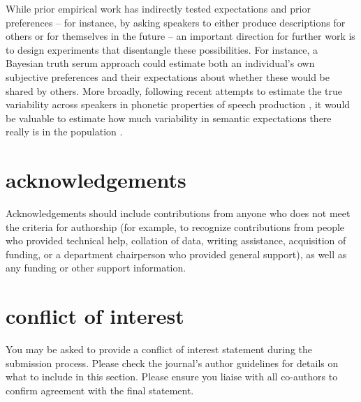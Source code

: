 \documentclass[alpha-refs]{wiley-article}
\begin{document}
While prior empirical work has indirectly tested expectations and prior preferences -- for instance, by asking speakers to either produce descriptions for others or for themselves in the future \citep{FussellKrauss89_IntendedAudienceCommonGround} -- an important direction for further work is to design experiments that disentangle these possibilities.
For instance, a Bayesian truth serum approach \citep{prelec2004bayesian} could estimate both an individual's own subjective preferences and their expectations about whether these would be shared by others.
More broadly, following recent attempts to estimate the true variability across speakers in phonetic properties of speech production \citep{kleinschmidt2019structure}, it would be valuable to estimate how much variability in semantic expectations there really is in the population \citep{FurnasEtAl87_VocabularyProblem}.

\section*{acknowledgements}
Acknowledgements should include contributions from anyone who does not meet the criteria for authorship (for example, to recognize contributions from people who provided technical help, collation of data, writing assistance, acquisition of funding, or a department chairperson who provided general support), as well as any funding or other support information.

\section*{conflict of interest}
You may be asked to provide a conflict of interest statement during the submission process. Please check the journal's author guidelines for details on what to include in this section. Please ensure you liaise with all co-authors to confirm agreement with the final statement.

\printendnotes




\end{document}
